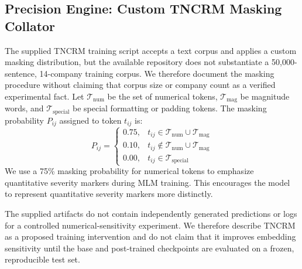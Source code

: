 \documentclass[pdflatex,sn-basic,Numbered]{sn-jnl}
\begin{document}
\subsection{Precision Engine: Custom TNCRM Masking Collator}
The supplied TNCRM training script accepts a text corpus and applies a custom masking distribution, but the available repository does not substantiate a 50,000-sentence, 14-company training corpus. We therefore document the masking procedure without claiming that corpus size or company count as a verified experimental fact. Let $\mathcal{T}_{\text{num}}$ be the set of numerical tokens, $\mathcal{T}_{\text{mag}}$ be magnitude words, and $\mathcal{T}_{\text{special}}$ be special formatting or padding tokens. The masking probability $P_{ij}$ assigned to token $t_{ij}$ is:
\begin{equation}
P_{ij} = \begin{cases} 
0.75, & t_{ij} \in \mathcal{T}_{\text{num}} \cup \mathcal{T}_{\text{mag}} \\
0.10, & t_{ij} \notin \mathcal{T}_{\text{num}} \cup \mathcal{T}_{\text{mag}} \\
0.00, & t_{ij} \in \mathcal{T}_{\text{special}}
\end{cases}
\end{equation}
We use a 75\% masking probability for numerical tokens to emphasize quantitative severity markers during MLM training. This encourages the model to represent quantitative severity markers more distinctly.

The supplied artifacts do not contain independently generated predictions or logs for a controlled numerical-sensitivity experiment. We therefore describe TNCRM as a proposed training intervention and do not claim that it improves embedding sensitivity until the base and post-trained checkpoints are evaluated on a frozen, reproducible test set.
\end{document}
